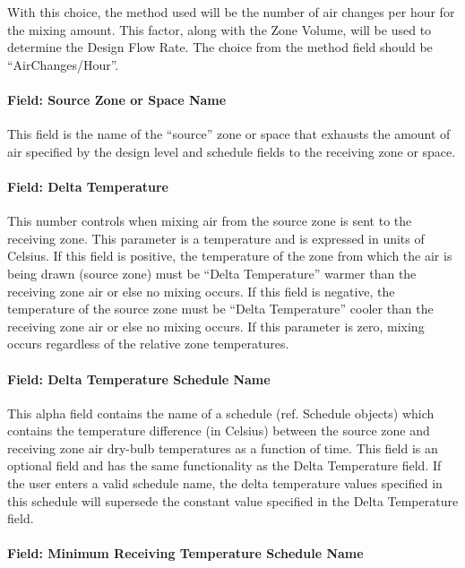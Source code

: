 With this choice, the method used will be the number of air changes per hour for the mixing amount. This factor, along with the Zone Volume, will be used to determine the Design Flow Rate. The choice from the method field should be ``AirChanges/Hour''.

\paragraph{Field: Source Zone or Space Name}\label{field-source-zone-name}

This field is the name of the ``source'' zone or space that exhausts the amount of air specified by the design level and schedule fields to the receiving zone or space.

\paragraph{Field: Delta Temperature}\label{field-delta-temperature-2}

This number controls when mixing air from the source zone is sent to the receiving zone. This parameter is a temperature and is expressed in units of Celsius. If this field is positive, the temperature of the zone from which the air is being drawn (source zone) must be ``Delta Temperature'' warmer than the receiving zone air or else no mixing occurs. If this field is negative, the temperature of the source zone must be ``Delta Temperature'' cooler than the receiving zone air or else no mixing occurs. If this parameter is zero, mixing occurs regardless of the relative zone temperatures.

\paragraph{Field: Delta Temperature Schedule Name}\label{field-delta-temperature-schedule-name-2}

This alpha field contains the name of a schedule (ref. Schedule objects) which contains the temperature difference (in Celsius) between the source zone and receiving zone air dry-bulb temperatures as a function of time. This field is an optional field and has the same functionality as the Delta Temperature field. If the user enters a valid schedule name, the delta temperature values specified in this schedule will supersede the constant value specified in the Delta Temperature field.

\paragraph{Field: Minimum Receiving Temperature Schedule Name}\label{field-minimum-zone-temperature-schedule-name}

